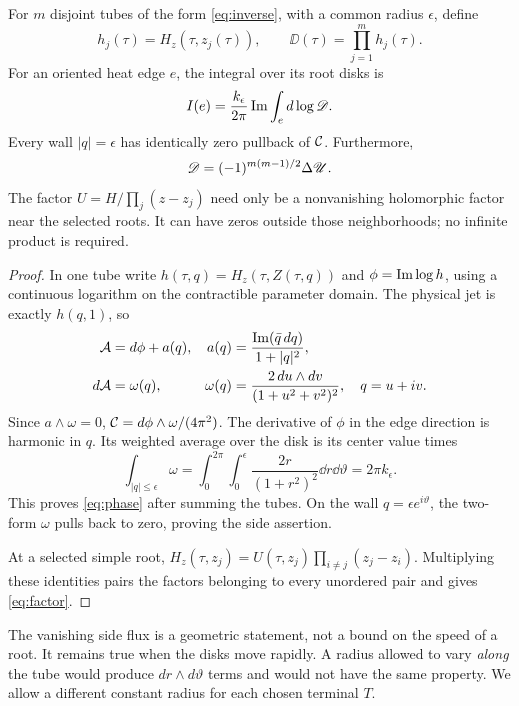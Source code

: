 \begin{proposition}
\label{prop:phase}
For $m$ disjoint tubes of the form \eqref{eq:inverse}, with a common
radius $\epsilon$, define
\begin{equation}
 h_j(\tau)=H_z(\tau,z_j(\tau)),\qquad
 \DD(\tau)=\prod_{j=1}^m h_j(\tau).
 \label{eq:D}
\end{equation}
For an oriented heat edge $e$, the integral over its root disks is
\begin{equation}
 I(e)=\frac{k_\epsilon}{2\pi}\operatorname{Im}\int_e d\log\mathscr D.
 \label{eq:phase}
\end{equation}
Every wall $|q|=\epsilon$ has identically zero pullback of $\mathcal C$.
Furthermore,
\begin{equation}
 \mathscr D=(-1)^{m(m-1)/2}\Delta\mathscr U.
 \label{eq:factor}
\end{equation}
The factor $U=H/\prod_j(z-z_j)$ need only be a nonvanishing
holomorphic factor near the selected roots. It can have zeros outside
those neighborhoods; no infinite product is required.
\end{proposition}
\begin{proof}
In one tube write $h(\tau,q)=H_z(\tau,Z(\tau,q))$ and
$\phi=\operatorname{Im}\log h$, using a continuous logarithm on the contractible
parameter domain. The physical jet is exactly $h(q,1)$, so
\begin{align}
 \mathcal A&=d\phi+a(q),&
 a(q)&=\frac{\operatorname{Im}(\bar q\,dq)}{1+|q|^2},\nonumber\\
 d\mathcal A&=\omega(q),&
 \omega(q)&=\frac{2\,du\wedge dv}{(1+u^2+v^2)^2},\quad q=u+iv.
 \label{eq:chart}
\end{align}
Since $a\wedge\omega=0$,
$\mathcal C=d\phi\wedge\omega/(4\pi^2)$. The derivative of $\phi$
in the edge direction is harmonic in $q$. Its weighted average over
the disk is its center value times
\[
 \int_{|q|\le\epsilon}\omega
 =\int_0^{2\pi}\int_0^\epsilon\frac{2r}{(1+r^2)^2}\dd r\dd\vartheta
 =2\pi k_\epsilon.
\]
This proves \eqref{eq:phase} after summing the tubes.
On the wall $q=\epsilon e^{i\vartheta}$, the two-form $\omega$
pulls back to zero, proving the side assertion.

At a selected simple root,
$H_z(\tau,z_j)=U(\tau,z_j)\prod_{i\ne j}(z_j-z_i)$.
Multiplying these identities pairs the factors belonging to every
unordered pair and gives \eqref{eq:factor}.
\end{proof}

The vanishing side flux is a geometric statement, not a bound on the
speed of a root. It remains true when the disks move rapidly. A
radius allowed to vary \emph{along} the tube would produce
$dr\wedge d\vartheta$ terms and would not have the same property.
We allow a different constant radius for each chosen terminal $T$.


